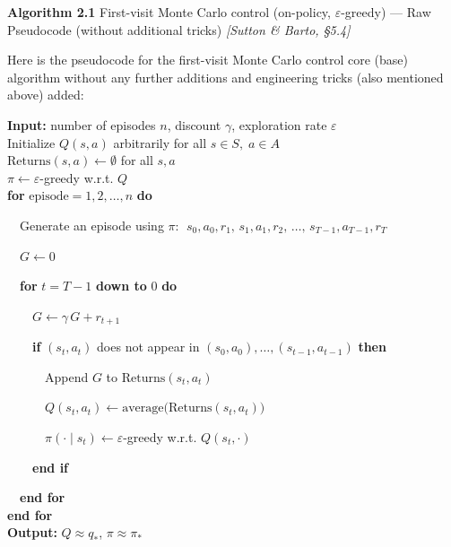 \documentclass[11pt]{article}
\begin{document}
    \label{pseudo-2-1}

    \begin{pseudobox}

\textbf{Algorithm 2.1} First-visit Monte Carlo control (on-policy,
\(\varepsilon\)-greedy) --- Raw Pseudocode (without additional tricks)
\emph{{[}Sutton \& Barto, §5.4{]}}

\tcbline

Here is the pseudocode for the first-visit Monte Carlo control core
(base) algorithm without any further additions and engineering tricks
(also mentioned above) added:

\textbf{Input:} number of episodes \(n\), discount \(\gamma\),
exploration rate \(\varepsilon\)\\
Initialize \(Q(s, a)\) arbitrarily for all \(s \in S,\; a \in A\)\\
\(\text{Returns}(s, a) \leftarrow \emptyset\) for all \(s, a\)\\
\(\pi \leftarrow \varepsilon\)-greedy w.r.t. \(Q\)\\
\textbf{for} \(\text{episode} = 1, 2, \ldots, n\) \textbf{do}\\
\strut ~~Generate an episode using \(\pi\):
\(\;s_0, a_0, r_1,\, s_1, a_1, r_2,\, \ldots,\, s_{T-1}, a_{T-1}, r_T\)\\
\strut ~~\(G \leftarrow 0\)\\
\strut ~~\textbf{for} \(t = T - 1\) \textbf{down to} \(0\) \textbf{do}\\
\strut ~~~~\(G \leftarrow \gamma\, G + r_{t+1}\)\\
\strut ~~~~\textbf{if} \((s_t, a_t)\) does not appear in
\((s_0, a_0), \ldots, (s_{t-1}, a_{t-1})\) \textbf{then}\\
\strut ~~~~~~Append \(G\) to \(\text{Returns}(s_t, a_t)\)\\
\strut ~~~~~~\(Q(s_t, a_t) \leftarrow \text{average}\bigl(\text{Returns}(s_t, a_t)\bigr)\)\\
\strut ~~~~~~\(\pi(\cdot \mid s_t) \leftarrow \varepsilon\)-greedy
w.r.t. \(Q(s_t, \cdot)\)\\
\strut ~~~~\textbf{end if}\\
\strut ~~\textbf{end for}\\
\textbf{end for}\\
\textbf{Output:} \(Q \approx q_{*}\), \(\pi \approx \pi_{*}\)

\end{pseudobox}
\end{document}
